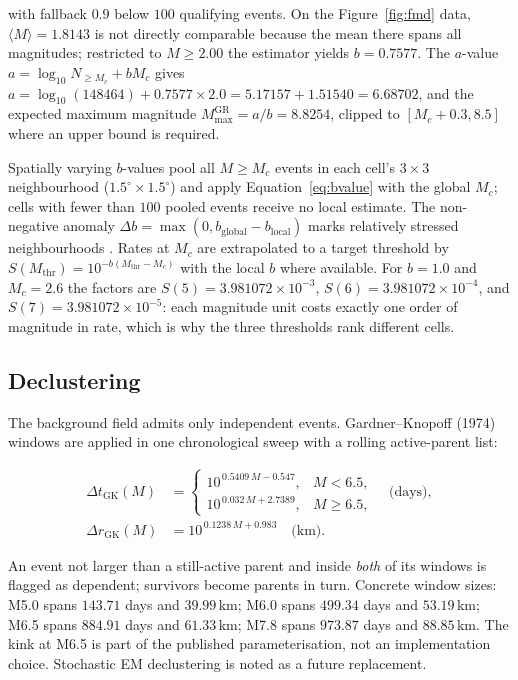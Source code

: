 \documentclass[11pt,a4paper]{article}
\begin{document}
with fallback $0.9$ below $100$ qualifying events. On the Figure~\ref{fig:fmd}
data, $\langle M\rangle=1.8143$ is not directly comparable because the mean
there spans all magnitudes; restricted to $M\ge2.00$ the estimator yields
$b=0.7577$. The $a$-value $a=\log_{10}N_{\ge M_c}+bM_c$ gives
$a=\log_{10}(148464)+0.7577\times2.0=5.17157+1.51540=6.68702$, and the
expected maximum magnitude $M_{\max}^{\mathrm{GR}}=a/b=8.8254$, clipped to
$[M_c+0.3,8.5]$ where an upper bound is required.

Spatially varying $b$-values pool all $M\ge M_c$ events in each cell's
$3\times3$ neighbourhood ($1.5^\circ\times1.5^\circ$) and apply
Equation~\eqref{eq:bvalue} with the global $M_c$; cells with fewer than $100$
pooled events receive no local estimate. The non-negative anomaly
$\Delta b=\max(0,b_{\text{global}}-b_{\text{local}})$ marks relatively
stressed neighbourhoods \cite{scholz1968,gulia2019}. Rates at $M_c$ are
extrapolated to a target threshold by
$S(M_{\mathrm{thr}})=10^{-b(M_{\mathrm{thr}}-M_c)}$ with the local $b$ where
available. For $b=1.0$ and $M_c=2.6$ the factors are
$S(5)=3.981072\times10^{-3}$, $S(6)=3.981072\times10^{-4}$, and
$S(7)=3.981072\times10^{-5}$: each magnitude unit costs exactly one order of
magnitude in rate, which is why the three thresholds rank different cells.

\subsection{Declustering}
The background field admits only independent events. Gardner--Knopoff (1974)
windows \cite{gardner1974} are applied in one chronological sweep with a
rolling active-parent list:

\begin{align}
\Delta t_{\mathrm{GK}}(M)&=
\begin{cases}
10^{\,0.5409\,M-0.547}, & M<6.5,\\
10^{\,0.032\,M+2.7389}, & M\ge6.5,
\end{cases}
\quad\text{(days)},\\
\Delta r_{\mathrm{GK}}(M)&=10^{\,0.1238\,M+0.983}
\quad\text{(km)}.
\end{align}

An event not larger than a still-active parent and inside \emph{both} of its
windows is flagged as dependent; survivors become parents in turn. Concrete
window sizes: M5.0 spans $143.71$ days and $39.99$\,km; M6.0 spans
$499.34$ days and $53.19$\,km; M6.5 spans $884.91$ days and $61.33$\,km; M7.8
spans $973.87$ days and $88.85$\,km. The kink at M6.5 is part of the
published parameterisation, not an implementation choice. Stochastic EM
declustering \cite{zhuang2002} is noted as a future replacement.
\end{document}

